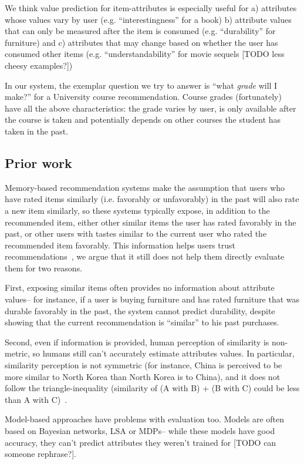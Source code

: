 \documentclass{article} %
\begin{document}
We think value prediction for item-attributes is especially useful for a) attributes whose values vary by user (e.g. ``interestingness'' for a book) b) attribute values that can only be measured after the item is consumed (e.g. ``durability'' for furniture) and c) attributes that may change based on whether the user has consumed other items (e.g. ``understandability'' for movie sequels [TODO less cheesy examples?]) 

In our system, the exemplar question we try to answer is ``what \textit{grade} will I make?'' for a University course recommendation. Course grades (fortunately) have all the above characteristics: the grade varies by user, is only available after the course is taken and potentially depends on other courses the student has taken in the past.

\subsection{Prior work}
Memory-based recommendation systems make the assumption that users who have rated items similarly (i.e. favorably or unfavorably) in the past will also rate a new item similarly, so these systems typically expose, in addition to the recommended item, either other similar items the user has rated favorably in the past, or other users with tastes similar to the current user who rated the recommended item favorably. This information helps users trust recommendations~\cite{o2005trust, adomavicius2005toward}, we argue that it still does not help them directly evaluate them for two reasons.

First, exposing similar items often provides no information about attribute values-- for instance, if a user is buying furniture and has rated furniture that was durable favorably in the past, the system cannot predict durability, despite showing that the current recommendation is ``similar'' to his past purchases. 

Second, even if information is provided, human perception of similarity is non-metric, so humans still can't accurately estimate attributes values. In particular, similarity perception is not symmetric (for instance, China is perceived to be more similar to North Korea than North Korea is to China), and it does not follow the triangle-inequality (similarity of (A with B) + (B with C) could be less than A with C)~\cite{tversky1982similarity}.

Model-based approaches have problems with evaluation too. Models are often based on Bayesian networks, LSA or MDPs-- while these models have good accuracy, they can't predict attributes they weren't trained for [TODO can someone rephrase?].
\end{document}
